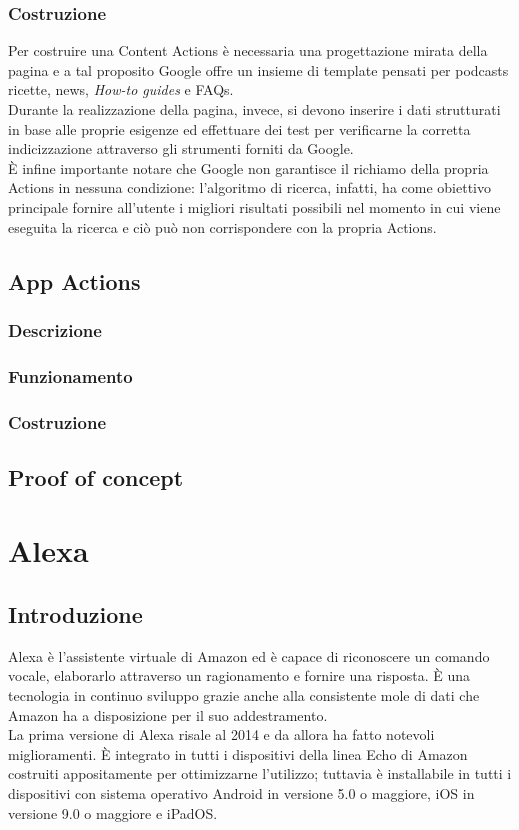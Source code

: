 		\subsubsection{Costruzione}
		Per costruire una Content Actions è necessaria una progettazione mirata della pagina e a tal proposito Google offre un insieme di template pensati per podcasts ricette, news, \textit{How-to guides} e FAQs. \\
		Durante la realizzazione della pagina, invece, si devono inserire i dati strutturati in base alle proprie esigenze ed effettuare dei test per verificarne la corretta indicizzazione attraverso gli strumenti forniti da Google. \\
		È infine importante notare che Google non garantisce il richiamo della propria Actions in nessuna condizione: l'algoritmo di ricerca, infatti, ha come obiettivo principale fornire all'utente i migliori risultati possibili nel momento in cui viene eseguita la ricerca e ciò può non corrispondere con la propria Actions.
	\subsection{App Actions}
		\subsubsection{Descrizione}
		\subsubsection{Funzionamento}
		\subsubsection{Costruzione}
	\subsection{Proof of concept}	

\section{Alexa}
	\subsection{Introduzione}
	Alexa è l'assistente virtuale di Amazon ed è capace di riconoscere un comando vocale, elaborarlo attraverso un ragionamento e fornire una risposta. È una tecnologia in continuo sviluppo grazie anche alla consistente mole di dati che Amazon ha a disposizione per il suo addestramento. \\
	La prima versione di Alexa risale al 2014 e da allora ha fatto notevoli miglioramenti. È integrato in tutti i dispositivi della linea Echo di Amazon costruiti appositamente per ottimizzarne l'utilizzo; tuttavia è installabile in tutti i dispositivi con sistema operativo Android in versione 5.0 o maggiore, iOS in versione 9.0 o maggiore e iPadOS.
